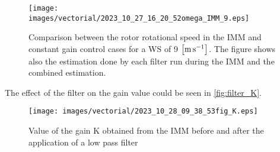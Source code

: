 \begin{figure}[htb]
  \centering
  \texttt{[image: images/vectorial/2023\_10\_27\_16\_20\_52omega\_IMM\_9.eps]}
  \caption{Comparison between the rotor rotational speed in the IMM and constant gain control cases for a WS of 9 $\left[\si{\meter\per\second}\right]$. The figure shows also the estimation done by each filter run during the IMM and the combined estimation.}
  \label{fig:fig_omega_IMM}
\end{figure}

The effect of the filter on the gain value could be seen in \autoref{fig:filter_K}.
\begin{figure}
  \centering
  \texttt{[image: images/vectorial/2023\_10\_28\_09\_38\_53fig\_K.eps]}
  \caption{Value of the gain K obtained from the IMM before and after the application of a low pass filter}
  \label{fig:filter_K}
\end{figure}
